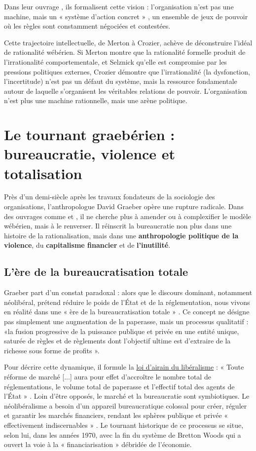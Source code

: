 Dans leur ouvrage \citep{CrozierFriedberg1977}, ils formalisent cette vision : l'organisation n'est pas une machine, mais un « système d'action concret » , un ensemble de jeux de pouvoir où les règles sont constamment négociées et contestées.

Cette trajectoire intellectuelle, de Merton à Crozier, achève de déconstruire l'idéal de rationalité wébérien. Si Merton montre que la rationalité formelle produit de l'irrationalité comportementale, et Selznick qu'elle est compromise par les pressions politiques externes, Crozier démontre que l'irrationalité (la dysfonction, l'incertitude) n'est pas un défaut du système, mais la ressource fondamentale autour de laquelle s'organisent les véritables relations de pouvoir. L'organisation n'est plus une machine rationnelle, mais une arène politique.

\chapter{Le tournant graebérien : bureaucratie, violence et totalisation}
Près d'un demi-siècle après les travaux fondateurs de la sociologie des organisations, l'anthropologue David Graeber opère une rupture radicale. Dans des ouvrages comme \citep{Graeber2015} et \citep{Graeber2018}, il ne cherche plus à amender ou à complexifier le modèle wébérien, mais à le renverser. Il réinscrit la bureaucratie non plus dans une histoire de la rationalisation, mais dans une \textbf{anthropologie politique de la violence}, du \textbf{capitalisme financier} et de \textbf{l'inutilité}.

\section{L'ère de la bureaucratisation totale}

Graeber part d'un constat paradoxal : alors que le discours dominant, notamment néolibéral, prétend réduire le poids de l'État et de la réglementation, nous vivons en réalité dans une « ère de la bureaucratisation totale » . Ce concept ne désigne pas simplement une augmentation de la paperasse, mais un processus qualitatif : «la fusion progressive de la puissance publique et privée en une entité unique, saturée de règles et de règlements dont l'objectif ultime est d'extraire de la richesse sous forme de profits ».

Pour décrire cette dynamique, il formule la \underline{loi d'airain du libéralisme}  : « Toute réforme de marché [...] aura pour effet d'accroître le nombre total de réglementations, le volume total de paperasse et l'effectif total des agents de l'État » . Loin d'être opposés, le marché et la bureaucratie sont symbiotiques. Le néolibéralisme a besoin d'un appareil bureaucratique colossal pour créer, réguler et garantir les marchés financiers, rendant les sphères publique et privée « effectivement indiscernables » . Le tournant historique de ce processus se situe, selon lui, dans les années 1970, avec la fin du système de Bretton Woods qui a ouvert la voie à la « financiarisation » débridée de l'économie.

